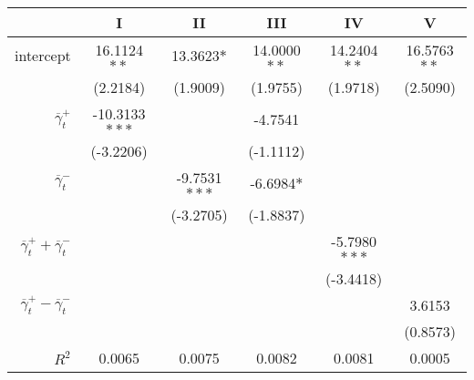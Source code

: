 \begin{tabular}{rSSSSS}
\toprule
{} &              I &            II &          III &            IV &            V \\
\midrule
intercept &    16.1124$**$ &    13.3623$*$ &  14.0000$**$ &   14.2404$**$ &  16.5763$**$ \\
          &       (2.2184) &      (1.9009) &     (1.9755) &      (1.9718) &     (2.5090) \\
$\overline \gamma^+_t$       &  -10.3133$***$ &               &      -4.7541 &               &              \\
          &      (-3.2206) &               &    (-1.1112) &               &              \\
$\overline \gamma^-_t$       &                &  -9.7531$***$ &   -6.6984$*$ &               &              \\
          &                &     (-3.2705) &    (-1.8837) &               &              \\
$\overline \gamma^+_t + \overline \gamma^-_t$   &                &               &              &  -5.7980$***$ &              \\
          &                &               &              &     (-3.4418) &              \\
$\overline \gamma^+_t - \overline \gamma^-_t$  &                &               &              &               &       3.6153 \\
          &                &               &              &               &     (0.8573) \\
\midrule
$R^2$ & 0.0065 & 0.0075 & 0.0082 & 0.0081 & 0.0005\\\bottomrule
\end{tabular}
